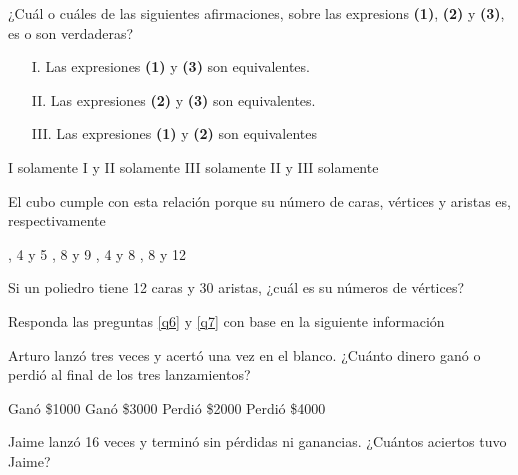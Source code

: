 \documentclass[10pt,letterpaper,addpoints]{exam}
\begin{document}
\begin{questions}
\begin{multicols}{2}
\begin{oneparchoices}
\end{oneparchoices}
  \question \label{q3} ¿Cuál o cuáles de las siguientes afirmaciones, sobre las expresions \textbf{(1)}, \textbf{(2)} y \textbf{(3)}, es o son verdaderas?
    \begin{itemize}
      \item[I.] Las expresiones \textbf{(1)} y \textbf{(3)} son equivalentes.
      \item[II.] Las expresiones \textbf{(2)} y \textbf{(3)} son equivalentes.
      \item[III.] Las expresiones \textbf{(1)} y \textbf{(2)} son equivalentes
      \end{itemize}
    \begin{choices}
      \choice I solamente
      \choice I y II solamente
      \CorrectChoice III solamente
      \choice II y III solamente    
    \end{choices}
  \question \label{q4} El cubo cumple con esta relación porque su número de caras, vértices y aristas es, respectivamente

\begin{oneparchoices}
      , 4 y 5
      , 8 y 9
      , 4 y 8
      , 8 y 12
\end{oneparchoices}
  \question \label{q5} Si un poliedro tiene 12 caras y 30 aristas, ¿cuál es su números de vértices?

\begin{oneparchoices}
\end{oneparchoices}
Responda las preguntas \ref{q6} y \ref{q7} con base en la siguiente información
  
\question \label{q6} Arturo lanzó tres veces y acertó una vez en el blanco. ¿Cuánto dinero ganó o perdió al final de los tres lanzamientos?
\begin{choices}
    \CorrectChoice Ganó \$1000
    \choice Ganó \$3000
    \choice Perdió \$2000
    \choice Perdió \$4000
\end{choices}
\question \label{q7} Jaime lanzó 16 veces y terminó sin pérdidas ni ganancias. ¿Cuántos aciertos tuvo Jaime?


\end{multicols}
\end{questions}
\end{document}
